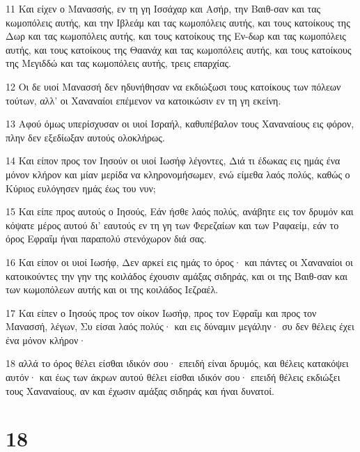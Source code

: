 \par 11 Και είχεν ο Μανασσής, εν τη γη Ισσάχαρ και Ασήρ, την Βαιθ-σαν και τας κωμοπόλεις αυτής, και την Ιβλεάμ και τας κωμοπόλεις αυτής, και τους κατοίκους της Δωρ και τας κωμοπόλεις αυτής, και τους κατοίκους της Εν-δωρ και τας κωμοπόλεις αυτής, και τους κατοίκους της Θαανάχ και τας κωμοπόλεις αυτής, και τους κατοίκους της Μεγιδδώ και τας κωμοπόλεις αυτής, τρεις επαρχίας.
\par 12 Οι δε υιοί Μανασσή δεν ηδυνήθησαν να εκδιώξωσι τους κατοίκους των πόλεων τούτων, αλλ' οι Χαναναίοι επέμενον να κατοικώσιν εν τη γη εκείνη.
\par 13 Αφού όμως υπερίσχυσαν οι υιοί Ισραήλ, καθυπέβαλον τους Χαναναίους εις φόρον, πλην δεν εξεδίωξαν αυτούς ολοκλήρως.
\par 14 Και είπον προς τον Ιησούν οι υιοί Ιωσήφ λέγοντες, Διά τι έδωκας εις ημάς ένα μόνον κλήρον και μίαν μερίδα να κληρονομήσωμεν, ενώ είμεθα λαός πολύς, καθώς ο Κύριος ευλόγησεν ημάς έως του νυν;
\par 15 Και είπε προς αυτούς ο Ιησούς, Εάν ήσθε λαός πολύς, ανάβητε εις τον δρυμόν και κόψατε μέρος αυτού δι' εαυτούς εν τη γη των Φερεζαίων και των Ραφαείμ, εάν το όρος Εφραΐμ ήναι παραπολύ στενόχωρον διά σας.
\par 16 Και είπον οι υιοί Ιωσήφ, Δεν αρκεί εις ημάς το όρος· και πάντες οι Χαναναίοι οι κατοικούντες την γην της κοιλάδος έχουσιν αμάξας σιδηράς, και οι της Βαιθ-σαν και των κωμοπόλεων αυτής και οι της κοιλάδος Ιεζραέλ.
\par 17 Και είπεν ο Ιησούς προς τον οίκον Ιωσήφ, προς τον Εφραΐμ και προς τον Μανασσή, λέγων, Συ είσαι λαός πολύς· και εις δύναμιν μεγάλην· συ δεν θέλεις έχει ένα μόνον κλήρον·
\par 18 αλλά το όρος θέλει είσθαι ιδικόν σου· επειδή είναι δρυμός, και θέλεις κατακόψει αυτόν· και έως των άκρων αυτού θέλει είσθαι ιδικόν σου· επειδή θέλεις εκδιώξει τους Χαναναίους, αν και έχωσιν αμάξας σιδηράς και ήναι δυνατοί.

\chapter{18}


